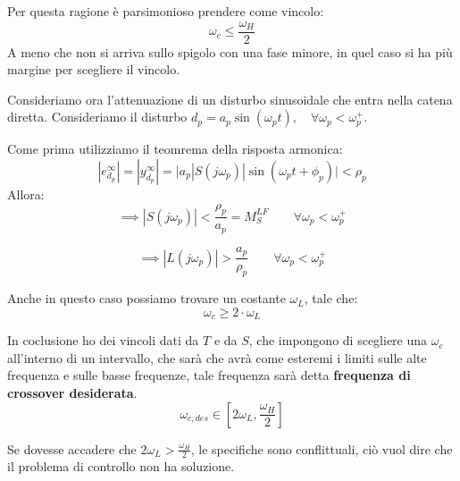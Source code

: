 \documentclass[12pt]{article}
\begin{document}
Per questa ragione \`e parsimonioso prendere come vincolo:
\[ \omega_c \leqslant \frac{\omega_H}{2}  \]
A meno che non si arriva sullo spigolo con una fase minore, in quel caso si ha pi\`u margine per scegliere il vincolo.

Consideriamo ora l'attenuazione di un disturbo sinusoidale che entra nella catena diretta. Consideriamo il disturbo $d_p = a_p\sin(\omega_pt),\quad \forall \omega_p < \omega_p^{+}$.

Come prima utilizziamo il teomrema della risposta armonica:
\[ |e_{d_p}^{\infty}| = |y _{d_p}^{\infty}| =  \big| a_p|S(j\omega_p)|\sin(\omega_pt + \phi_p) \big| < \rho_p  \]
Allora:
\[ \implies |S(j\omega_p)| < \frac{\rho_p}{a_p} = M_S^{LF} \qquad \forall \omega_p < \omega_p^{+} \]

\[ \implies |L(j\omega_p)| > \frac{a_p}{\rho_p} \qquad \forall \omega_p < \omega_p^{+} \]

Anche in questo caso possiamo trovare un costante $\omega_L$, tale che:
\[ \omega_c \geqslant  2\cdot\omega_L \]

In coclusione ho dei vincoli dati da $T$ e da $S$, che impongono di scegliere una $\omega_c$ all'interno di un intervallo, che sar\`a che avr\`a come esteremi i limiti sulle alte frequenza e sulle basse frequenze, tale frequenza sar\`a detta \textbf{frequenza di crossover desiderata}.
\[ \omega_{c,des} \in \left[ 2\omega_L, \frac{\omega_H}{2}  \right] \]

Se dovesse accadere che $2\omega_L > \frac{\omega_H}{2}$, le specifiche sono conflittuali, ci\`o vuol dire che il problema di controllo non ha soluzione.



\newpage
\end{document}
